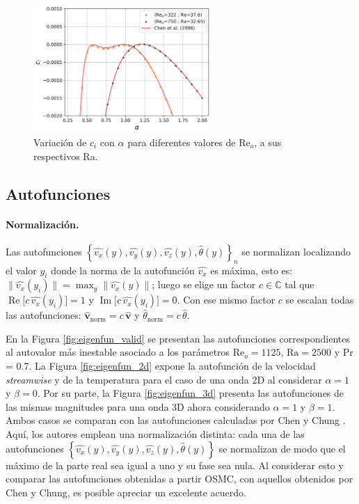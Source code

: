 \begin{figure}[H]
	 \centering
    	\includegraphics[width=0.6\textwidth]{figures/cap4/osmc/eigenvalues.png}
	 \caption{Variación de $c_i$ con $\alpha$ para diferentes valores de Re$_o$, a sus respectivos Ra.} 
 \label{fig:eigenval_alpha}
\end{figure}


\subsection{Autofunciones}

\paragraph{Normalización.}
Las autofunciones $\left\lbrace \widehat{v_x}(y),\widehat{v_y}(y),\widehat{v_z}(y), \widehat{\theta}(y) \right\rbrace_n$ se normalizan localizando el valor $y_i$ donde la norma de la autofunción $\widehat{v_x}$ es máxima, esto es: $\lVert \widehat{v_x} (y_i) \rVert = \max_{y} \lVert \widehat{v_x}(y) \rVert$; luego se elige un factor $c\in\mathbb{C}$ tal que $\operatorname{Re}\!\big[c\,\widehat{v_x}(y_i)\big]=1$ y $\operatorname{Im}\!\big[c\,\widehat{v_x}(y_i)\big]=0$. Con ese mismo factor $c$ se escalan todas las autofunciones: $\boldsymbol{\widehat{v}}_{\mathrm{norm}}=c\,\boldsymbol{\widehat{v}}$ y $\widehat{\theta}_{\mathrm{norm}}=c\,\widehat{\theta}$.

En la Figura \ref{fig:eigenfun_valid} se presentan las autofunciones correspondientes al autovalor más inestable asociado a los parámetros $\text{Re}_o=1125$, $\text{Ra}=2500$ y Pr = 0.7. La Figura \ref{fig:eigenfun_2d} expone la autofunción de la velocidad \textit{streamwise} y de la temperatura para el caso de una onda 2D al considerar $\alpha=1$ y $\beta=0$. Por su parte, la Figura \ref{fig:eigenfun_3d} presenta las autofunciones de las mismas magnitudes para una onda 3D ahora considerando $\alpha=1$ y $\beta=1$. Ambos casos se comparan con las autofunciones calculadas por Chen y Chung \cite{chen2003direct}. Aquí, los autores emplean una normalización distinta: cada una de las autofunciones $\left\lbrace \widehat{v_x}(y), \widehat{v_y}(y), \widehat{v_z}(y), \widehat{\theta}(y) \right\rbrace$ se normalizan de modo que el máximo de la parte real sea igual a uno y su fase sea nula. Al considerar esto y comparar las autofunciones obtenidas a partir OSMC, con aquellos obtenidos por Chen y Chung, es posible apreciar un excelente acuerdo.

